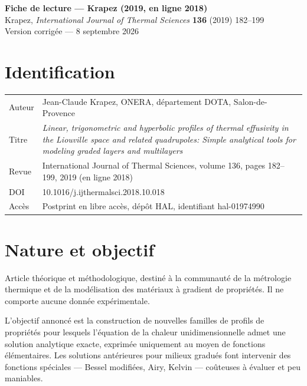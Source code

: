 \documentclass[11pt,a4paper]{article}
\begin{document}
\begin{center}
{\Large\bfseries Fiche de lecture --- Krapez (2019, en ligne 2018)}\\[4pt]
{\small Krapez, \emph{International Journal of Thermal Sciences} \textbf{136} (2019) 182--199}\\[2pt]
{\small Version corrigée --- 8 septembre 2026}
\end{center}

\vspace{4pt}


\section{Identification}

\begin{center}
\begin{tabularx}{\textwidth}{@{}lX@{}}
\toprule
Auteur & Jean-Claude Krapez, ONERA, département DOTA, Salon-de-Provence \\
Titre & \emph{Linear, trigonometric and hyperbolic profiles of thermal effusivity in the Liouville
space and related quadrupoles: Simple analytical tools for modeling graded layers and multilayers} \\
Revue & International Journal of Thermal Sciences, volume 136, pages 182--199, 2019 (en ligne 2018) \\
DOI & 10.1016/\allowbreak j.ijthermalsci.2018.10.018 \\
Accès & Postprint en libre accès, dépôt HAL, identifiant hal-01974990 \\
\bottomrule
\end{tabularx}
\end{center}

\section{Nature et objectif}

Article théorique et méthodologique, destiné à la communauté de la métrologie thermique et de la
modélisation des matériaux à gradient de propriétés. Il ne comporte aucune donnée expérimentale.

L'objectif annoncé est la construction de nouvelles familles de profils de propriétés pour lesquels
l'équation de la chaleur unidimensionnelle admet une solution analytique exacte, exprimée uniquement
au moyen de fonctions élémentaires. Les solutions antérieures pour milieux gradués font intervenir des
fonctions spéciales --- Bessel modifiées, Airy, Kelvin --- coûteuses à évaluer et peu maniables.
\end{document}
